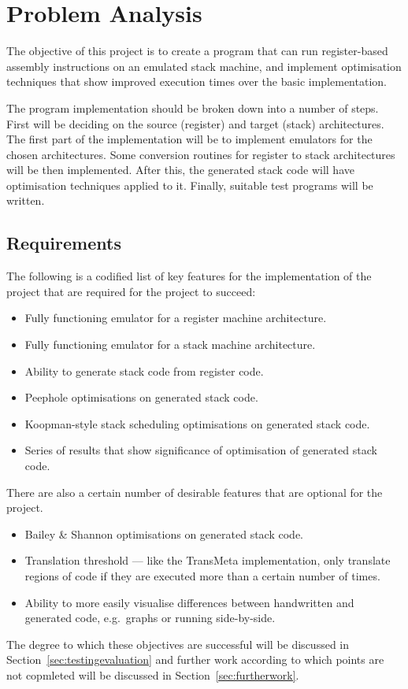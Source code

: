 \chapter{Problem Analysis}\label{ch:problemanalysis}
The objective of this project is to create a program that can run
register-based assembly instructions on an emulated stack machine, and implement
optimisation techniques that show improved execution times over the basic
implementation.

The program implementation should be broken down into a number of steps. First
will be deciding on the source (register) and target (stack) architectures.  The
first part of the implementation will be to implement emulators for the chosen
architectures.  Some conversion routines for register to stack architectures
will be then implemented. After this, the generated stack code will have
optimisation techniques applied to it. Finally, suitable test programs will be
written.

\section{Requirements}
The following is a codified list of key features for the implementation of
the project that are required for the project to succeed:

\begin{itemize}[noitemsep]
  \item Fully functioning emulator for a register machine architecture.
  \item Fully functioning emulator for a stack machine architecture.
  \item Ability to generate stack code from register code.
  \item Peephole optimisations on generated stack code.
  \item Koopman-style stack scheduling optimisations on generated stack code.
  \item Series of results that show significance of optimisation of generated
    stack code.
\end{itemize}

There are also a certain number of desirable features that are optional for the
project.

\begin{itemize}[noitemsep]
  \item Bailey \& Shannon optimisations on generated stack code.
  \item Translation threshold --- like the TransMeta implementation, only
  translate regions of code if they are executed more than a certain number of
  times.
  \item Ability to more easily visualise differences between handwritten and
  generated code, e.g.\ graphs or running side-by-side.
\end{itemize}

The degree to which these objectives are successful will be discussed in
Section~\ref{sec:testingevaluation} and further work according to which points
are not copmleted will be discussed in Section~\ref{sec:furtherwork}.
